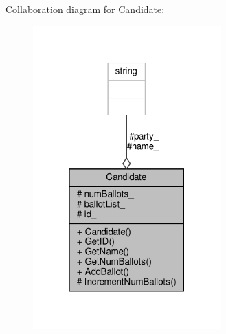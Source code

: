 Collaboration diagram for Candidate\+:
\nopagebreak
\begin{figure}[H]
\begin{center}
\leavevmode
\includegraphics[width=205pt]{classCandidate__coll__graph}
\end{center}
\end{figure}
